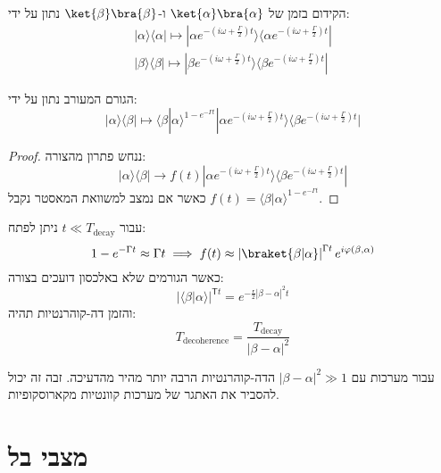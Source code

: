 \documentclass{tstextbook}
\begin{document}
\begin{proposition}
הקידום בזמן של \(\ket{\alpha}\bra{\alpha}\) ו-\(\ket{\beta}\bra{\beta}\) נתון על ידי:
\begin{gather*}|\alpha\rangle\langle\alpha|\mapsto|\alpha e^{-(i\omega+\frac{\Gamma}{2})t}\rangle\langle\alpha e^{-(i\omega+\frac{\Gamma}{2})t}|\\|\beta\rangle\langle\beta|\mapsto|\beta e^{-(i\omega+\frac{\Gamma}{2})t}\rangle\langle\beta e^{-(i\omega+\frac{\Gamma}{2})t}| 
\end{gather*}

\end{proposition}
\begin{proposition}
הגורם המעורב נתון על ידי:
$$|\alpha\rangle\langle\beta|\mapsto \langle\beta|\alpha\rangle^{1-e^{-\Gamma t}}|\alpha e^{-(i\omega+\frac{\Gamma}{2})t}\rangle\langle\beta e^{-(i\omega+\frac{\Gamma}{2})t}|$$

\end{proposition}
\begin{proof}
ננחש פתרון מהצורה:
$$|\alpha\rangle\langle\beta|\to f(t)|\alpha e^{-(i\omega+\frac{\Gamma}{2})t}\rangle\langle\beta e^{-(i\omega+\frac{\Gamma}{2})t}|$$
כאשר אם נמצב למשוואת המאסטר נקבל \(f(t)=\langle\beta|\alpha\rangle^{1-e^{-\Gamma t}}\).

\end{proof}
\begin{corollary}
עבור \(t\ll T_{\mathrm{decay}}\) ניתן לפתח:
$$1-e^{ -\Gamma t }\approx \Gamma t\implies f(t)\approx \left\lvert  \braket{ \beta | \alpha }   \right\rvert ^{\Gamma t}e^{ i\varphi\left( \beta,\alpha \right) }$$
כאשר הגורמים שלא באלכסון דועכים בצורה:
$$|\langle\beta|\alpha\rangle|^{\mathsf{T}t}=e^{-\frac{\mathsf{r}}{2}|\beta-\alpha|^{2}t}$$
והזמן דה-קוהרנטיות תהיה:
$$T_{\mathrm{decoherence}}={\frac{T_{\mathrm{decay}}}{|\beta-\alpha|^{2}}}$$

\end{corollary}
\begin{corollary}
עבור מערכות עם \(\left\lvert  \beta-\alpha  \right\rvert^{2}\gg 1\) הדה-קוהרנטיות הרבה יותר מהיר מהדעיכה. זבה זה יכול להסביר את האתגר של מערכות קוונטיות מקארוסקופיות.

\end{corollary}

\section{מצבי בל}
\end{document}
